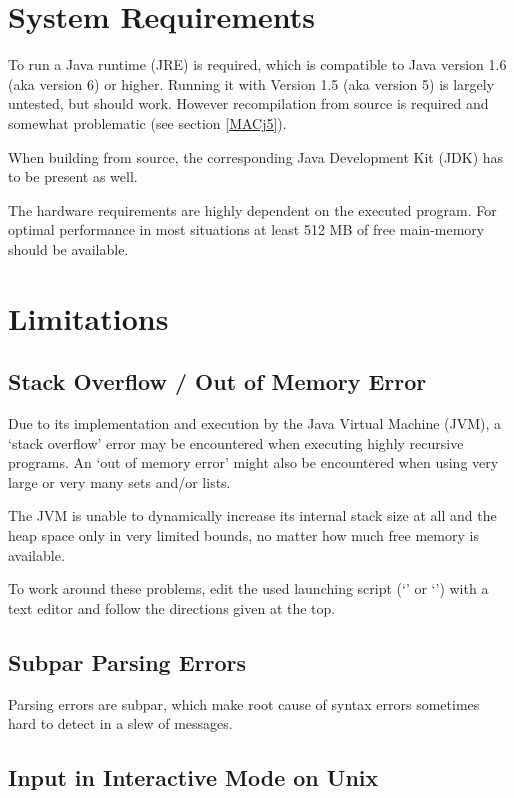 \section{System Requirements}

To run \setlX{} a Java runtime (JRE) is required, which is compatible to Java version 1.6 (aka version 6) or higher. Running it with Version 1.5 (aka version 5) is largely untested, but should work. However recompilation from source is required and somewhat problematic (see section \ref{MACj5}).

When building from source, the corresponding Java Development Kit (JDK) has to be present as well.

The hardware requirements are highly dependent on the executed \SetlX{} program. For optimal performance in most situations at least 512 MB of free main-memory should be available.

\section{Limitations}

\subsection{Stack Overflow \slash{} Out of Memory Error}

Due to its implementation and execution by the Java Virtual Machine (JVM), a `stack overflow' error may be encountered when executing highly recursive \SetlX{} programs. An `out of memory error' might also be encountered when using very large or very many sets and\slash{}or lists.

The JVM is unable to dynamically increase its internal stack size at all and the heap space only in very limited bounds, no matter how much free memory is available.

To work around these problems, edit the used launching script (`' or `') with a text editor and follow the directions given at the top.

\subsection{Subpar Parsing Errors}

Parsing errors are subpar, which make root cause of syntax errors sometimes hard to detect in a slew of messages.

\subsection{Input in Interactive Mode on Unix}


